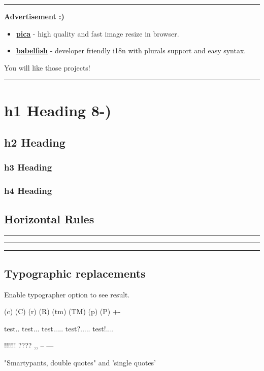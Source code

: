 \documentclass{article}
\begin{document}
\rule{\textwidth}{0.4pt}\textbf{Advertisement :)}

\begin{itemize}
\item \textbf{\href{https://nodeca.github.io/pica/demo/}{pica}} - high quality and fast image
resize in browser.
\item \textbf{\href{https://github.com/nodeca/babelfish/}{babelfish}} - developer friendly
i18n with plurals support and easy syntax.


\end{itemize}
You will like those projects!

\rule{\textwidth}{0.4pt}

\section{h1 Heading 8-)}\subsection{h2 Heading}\subsubsection{h3 Heading}\subsubsection{h4 Heading}



\subsection{Horizontal Rules}

\rule{\textwidth}{0.4pt}

\rule{\textwidth}{0.4pt}

\rule{\textwidth}{0.4pt}



\subsection{Typographic replacements}

Enable typographer option to see result.

(c) (C) (r) (R) (tm) (TM) (p) (P) +-

test.. test... test..... test?..... test!....

!!!!!! ???? ,,  -- ---

"Smartypants, double quotes" and 'single quotes'
\end{document}
